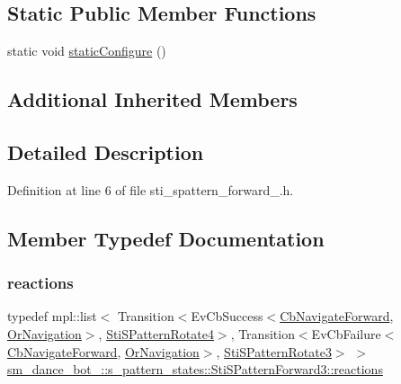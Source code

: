 \subsection*{Static Public Member Functions}
\begin{DoxyCompactItemize}
\item 
static void \hyperlink{structsm__dance__bot__2_1_1s__pattern__states_1_1StiSPatternForward3_a7862e1430240ac17d696d547e12872af}{static\+Configure} ()
\end{DoxyCompactItemize}
\subsection*{Additional Inherited Members}


\subsection{Detailed Description}


Definition at line 6 of file sti\+\_\+spattern\+\_\+forward\+\_.\+h.



\subsection{Member Typedef Documentation}
\mbox{\label{structsm__dance__bot__2_1_1s__pattern__states_1_1StiSPatternForward3_a5928b0e9751fe1cb371aa33973e3bcda}} 
\subsubsection{\texorpdfstring{reactions}{reactions}}
{\footnotesize\ttfamily typedef mpl\+::list$<$ Transition$<$Ev\+Cb\+Success$<$\hyperlink{classcl__move__base__z_1_1CbNavigateForward}{Cb\+Navigate\+Forward}, \hyperlink{classsm__dance__bot__2_1_1OrNavigation}{Or\+Navigation}$>$, \hyperlink{structsm__dance__bot__2_1_1s__pattern__states_1_1StiSPatternRotate4}{Sti\+S\+Pattern\+Rotate4}$>$, Transition$<$Ev\+Cb\+Failure$<$\hyperlink{classcl__move__base__z_1_1CbNavigateForward}{Cb\+Navigate\+Forward}, \hyperlink{classsm__dance__bot__2_1_1OrNavigation}{Or\+Navigation}$>$, \hyperlink{structsm__dance__bot__2_1_1s__pattern__states_1_1StiSPatternRotate3}{Sti\+S\+Pattern\+Rotate3}$>$ $>$ \hyperlink{structsm__dance__bot__2_1_1s__pattern__states_1_1StiSPatternForward3_a5928b0e9751fe1cb371aa33973e3bcda}{sm\+\_\+dance\+\_\+bot\+\_\+::s\+\_\+pattern\+\_\+states\+::\+Sti\+S\+Pattern\+Forward3\+::reactions}}



